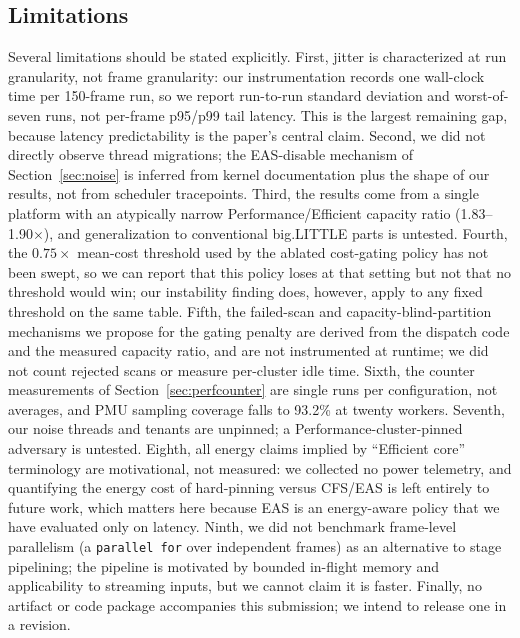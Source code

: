 \documentclass[conference]{IEEEtran}
\begin{document}
\subsection{Limitations}
\label{sec:limitations}
Several limitations should be stated explicitly. First, jitter is characterized at run granularity, not frame granularity: our instrumentation records one wall-clock time per 150-frame run, so we report run-to-run standard deviation and worst-of-seven runs, not per-frame p95/p99 tail latency. This is the largest remaining gap, because latency predictability is the paper's central claim. Second, we did not directly observe thread migrations; the EAS-disable mechanism of Section~\ref{sec:noise} is inferred from kernel documentation plus the shape of our results, not from scheduler tracepoints. Third, the results come from a single platform with an atypically narrow Performance/Efficient capacity ratio (1.83--1.90$\times$), and generalization to conventional big.LITTLE parts is untested. Fourth, the $0.75\times$ mean-cost threshold used by the ablated cost-gating policy has not been swept, so we can report that this policy loses at that setting but not that no threshold would win; our instability finding does, however, apply to any fixed threshold on the same table. Fifth, the failed-scan and capacity-blind-partition mechanisms we propose for the gating penalty are derived from the dispatch code and the measured capacity ratio, and are not instrumented at runtime; we did not count rejected scans or measure per-cluster idle time. Sixth, the counter measurements of Section~\ref{sec:perfcounter} are single runs per configuration, not averages, and PMU sampling coverage falls to 93.2\% at twenty workers. Seventh, our noise threads and tenants are unpinned; a Performance-cluster-pinned adversary is untested. Eighth, all energy claims implied by ``Efficient core'' terminology are motivational, not measured: we collected no power telemetry, and quantifying the energy cost of hard-pinning versus CFS/EAS is left entirely to future work, which matters here because EAS is an energy-aware policy that we have evaluated only on latency. Ninth, we did not benchmark frame-level parallelism (a \texttt{parallel for} over independent frames) as an alternative to stage pipelining; the pipeline is motivated by bounded in-flight memory and applicability to streaming inputs, but we cannot claim it is faster. Finally, no artifact or code package accompanies this submission; we intend to release one in a revision.

\end{document}
